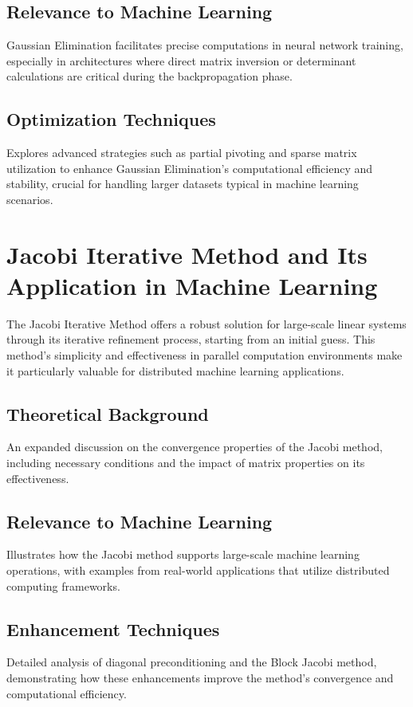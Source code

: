 \documentclass{article}
\begin{document}
\subsection{Relevance to Machine Learning}
Gaussian Elimination facilitates precise computations in neural network training, especially in architectures where direct matrix inversion or determinant calculations are critical during the backpropagation phase.

\subsection{Optimization Techniques}
Explores advanced strategies such as partial pivoting and sparse matrix utilization to enhance Gaussian Elimination's computational efficiency and stability, crucial for handling larger datasets typical in machine learning scenarios.

\section{Jacobi Iterative Method and Its Application in Machine Learning}
The Jacobi Iterative Method offers a robust solution for large-scale linear systems through its iterative refinement process, starting from an initial guess. This method's simplicity and effectiveness in parallel computation environments make it particularly valuable for distributed machine learning applications.

\subsection{Theoretical Background}
An expanded discussion on the convergence properties of the Jacobi method, including necessary conditions and the impact of matrix properties on its effectiveness.

\subsection{Relevance to Machine Learning}
Illustrates how the Jacobi method supports large-scale machine learning operations, with examples from real-world applications that utilize distributed computing frameworks.

\subsection{Enhancement Techniques}
Detailed analysis of diagonal preconditioning and the Block Jacobi method, demonstrating how these enhancements improve the method’s convergence and computational efficiency.
\end{document}
